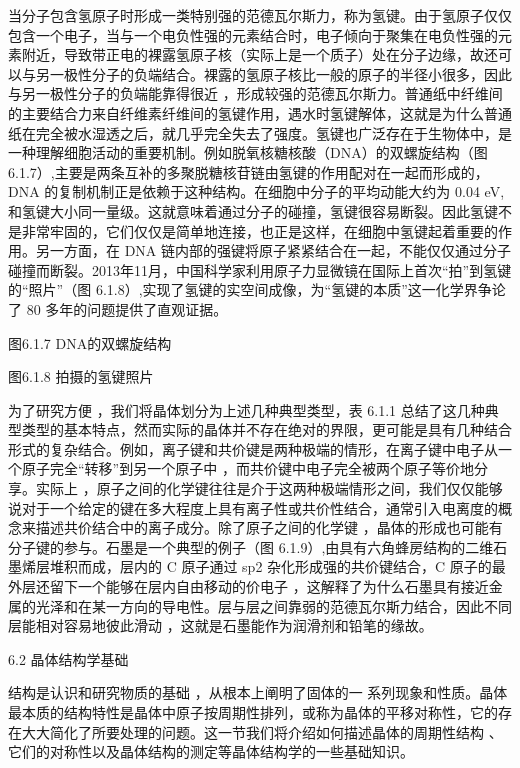 当分子包含氢原子时形成一类特别强的范德瓦尔斯力，称为氢键。由于氢原子仅仅包含一个电子，当与一个电负性强的元素结合时，电子倾向于聚集在电负性强的元素附近，导致带正电的裸露氢原子核（实际上是一个质子）处在分子边缘，故还可以与另一极性分子的负端结合。裸露的氢原子核比一般的原子的半径小很多，因此与另一极性分子的负端能靠得很近 ，形成较强的范德瓦尔斯力。普通纸中纤维间的主要结合力来自纤维素纤维间的氢键作用，遇水时氢键解体，这就是为什么普通纸在完全被水湿透之后，就几乎完全失去了强度。氢键也广泛存在于生物体中，是一种理解细胞活动的重要机制。例如脱氧核糖核酸（DNA）的双螺旋结构（图 6.1.7）,主要是两条互补的多聚脱糖核苷链由氢键的作用配对在一起而形成的，DNA 的复制机制正是依赖于这种结构。在细胞中分子的平均动能大约为 0.04 eV, 和氢键大小同一量级。这就意味着通过分子的碰撞，氢键很容易断裂。因此氢键不是非常牢固的，它们仅仅是简单地连接，也正是这样，在细胞中氢键起着重要的作用。另一方面，在 DNA 链内部的强键将原子紧紧结合在一起，不能仅仅通过分子碰撞而断裂。2013年11月，中国科学家利用原子力显微镜在国际上首次“拍”到氢键的“照片”（图 6.1.8）,实现了氢键的实空间成像，为“氢键的本质”这一化学界争论了 80 多年的问题提供了直观证据。



图6.1.7 DNA的双螺旋结构



图6.1.8 拍摄的氢键照片

为了研究方便 ，我们将晶体划分为上述几种典型类型，表 6.1.1 总结了这几种典型类型的基本特点，然而实际的晶体并不存在绝对的界限，更可能是具有几种结合形式的复杂结合。例如，离子键和共价键是两种极端的情形，在离子键中电子从一个原子完全“转移”到另一个原子中 ，而共价键中电子完全被两个原子等价地分享。实际上 ，原子之间的化学键往往是介于这两种极端情形之间，我们仅仅能够说对于一个给定的键在多大程度上具有离子性或共价性结合，通常引入电离度的概念来描述共价结合中的离子成分。除了原子之间的化学键 ，晶体的形成也可能有分子键的参与。石墨是一个典型的例子（图 6.1.9）,由具有六角蜂房结构的二维石墨烯层堆积而成，层内的 C 原子通过 sp2 杂化形成强的共价键结合，C 原子的最外层还留下一个能够在层内自由移动的价电子 ，这解释了为什么石墨具有接近金属的光泽和在某一方向的导电性。层与层之间靠弱的范德瓦尔斯力结合，因此不同层能相对容易地彼此滑动 ，这就是石墨能作为润滑剂和铅笔的缘故。







6.2 晶体结构学基础

结构是认识和研究物质的基础 ，从根本上阐明了固体的一 系列现象和性质。晶体最本质的结构特性是晶体中原子按周期性排列，或称为晶体的平移对称性，它的存在大大简化了所要处理的问题。这一节我们将介绍如何描述晶体的周期性结构 、它们的对称性以及晶体结构的测定等晶体结构学的一些基础知识。

